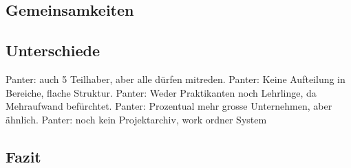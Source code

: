 \subsection{Gemeinsamkeiten}

\subsection{Unterschiede}
Panter: auch 5 Teilhaber, aber alle dürfen mitreden.
Panter: Keine Aufteilung in Bereiche, flache Struktur.
Panter: Weder Praktikanten noch Lehrlinge, da Mehraufwand befürchtet.
Panter: Prozentual mehr grosse Unternehmen, aber ähnlich.
Panter: noch kein Projektarchiv, work ordner System

\subsection{Fazit}
